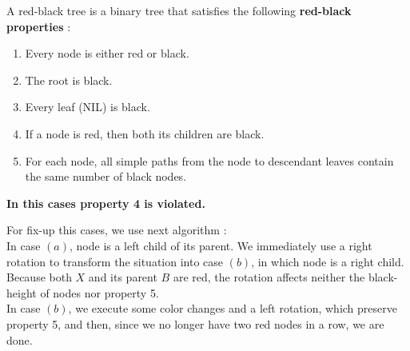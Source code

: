 \documentclass{article}
\begin{document}

A red-black tree is a binary tree that satisfies the following \textbf{red-black
  properties} \cite[13.1]{introtoalg}: 

\begin{enumerate}
\item Every node is either red or black.
\item The root is black.
\item Every leaf (NIL) is black.
\item If a node is red, then both its children are black.
\item For each node, all simple paths from the node to descendant leaves contain the
same number of black nodes. 
\end{enumerate}

\textbf{In this cases property 4 is violated.}

For fix-up this cases, we use next algorithm \cite[p.320]{introtoalg}:\\

In case $( a )$, node is a left child of its parent. We immediately use a
right rotation to transform the situation into case $( b )$, in which node is a
right child. Because both $X$ and its parent $B$ are red, the rotation affects
neither the black-height of nodes nor property 5.\\

In case $( b )$, we execute some color changes and a left rotation, which
preserve property 5, and then, since we no longer have two red nodes in a row,
we are done. 
\end{document}
